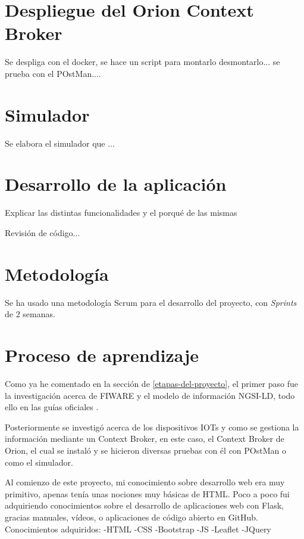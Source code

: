 
\section{Despliegue del Orion Context Broker}
Se despliga con el docker, se hace un script para montarlo desmontarlo... se prueba con el POstMan....

\section{Simulador}
Se elabora el simulador que ...


\section{Desarrollo de la aplicación}
Explicar las distintas funcionalidades y el porqué de las mismas

Revisión de código...


\section{Metodología}
Se ha usado una metodología Scrum para el desarrollo del proyecto, con \textit{Sprints} de 2 semanas.

\section{Proceso de aprendizaje}

Como ya he comentado en la sección de \ref{etapas-del-proyecto}, el primer paso fue la investigación acerca de FIWARE y el modelo de información NGSI-LD, todo ello en las guías oficiales \cite{fiware,fiware_ngsi_ld,etsi}. 

Posteriormente se investigó acerca de los dispositivos IOTs y como se gestiona la información mediante un Context Broker, en este caso, el Context Broker de Orion, el cual se instaló y se hicieron diversas pruebas con él con POstMan o como el simulador.

Al comienzo de este proyecto, mi conocimiento sobre desarrollo web era muy primitivo, apenas tenía unas nociones muy básicas de HTML. Poco a poco fui adquiriendo conocimientos sobre el desarrollo de aplicaciones web con Flask, gracias manuales, vídeos, o aplicaciones de código abierto en GitHub.
Conocimientos adquiridos:
-HTML
-CSS
-Bootstrap
-JS
-Leaflet
-JQuery




